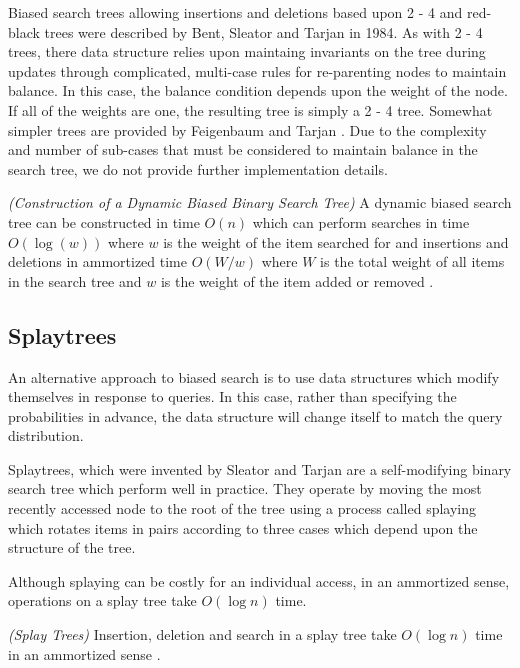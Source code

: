 \documentclass[mcs]{scsthesis}
\begin{document}
Biased search trees allowing insertions and deletions based upon 2 - 4 and
red-black trees were described by Bent, Sleator and Tarjan \cite{bst} in 1984.
As with 2 - 4 trees, there data structure relies upon maintaing invariants
on the tree during updates through complicated, multi-case rules for
re-parenting nodes to maintain balance. In this case, the balance condition
depends upon the weight of the node. If all of the weights are one, the
resulting tree is simply a 2 - 4 tree. Somewhat simpler trees are provided
by Feigenbaum and Tarjan \cite{bst2}. Due to the complexity and number of
sub-cases that must be considered to maintain balance in the search tree, we do
not provide further implementation details.

\begin{thm} \emph{(Construction of a Dynamic Biased Binary Search Tree)} 
A dynamic biased search tree can be constructed in time \(O(n)\) which can
perform searches in time \(O(\log(w))\) where \(w\) is the weight of the item
searched for and insertions and deletions in ammortized time \(O(W / w)\)
where \(W\) is the total weight of all items in the search tree and \(w\) is
the weight of the item added or removed \cite{bst2}.
\end{thm}

\subsection{Splaytrees}

An alternative approach to biased search is to use data structures which
modify themselves in response to queries. In this case, rather than specifying
the probabilities in advance, the data structure will change itself to match
the query distribution. 

Splaytrees, which were invented by Sleator and Tarjan \cite{splaytree} are a
self-modifying binary search tree which perform well in practice. They operate
by moving the most recently accessed node to the root of the tree using a
process called splaying which rotates items in pairs according to three cases
which depend upon the structure of the tree.

Although splaying can be costly for an individual access, in an ammortized
sense, operations on a splay tree take \(O(\log n)\) time.

\begin{thm} \emph{(Splay Trees)} 
Insertion, deletion and search in a splay tree take \(O(\log n)\) time in
an ammortized sense \cite{splaytree}.
\end{thm}
\end{document}
